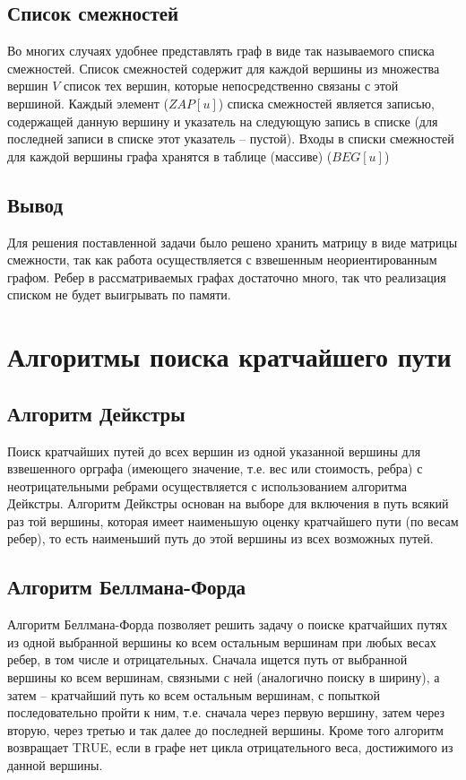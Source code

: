 \subsection{Список смежностей}

Во многих случаях удобнее представлять граф в виде так называемого списка
смежностей. Список смежностей содержит для каждой вершины из множества
вершин $V$ список тех вершин, которые непосредственно связаны с этой вершиной.
Каждый элемент ($ZAP[u]$) списка смежностей является записью, содержащей данную
вершину и указатель на следующую запись в списке (для последней записи в списке
этот указатель – пустой). Входы в списки смежностей для каждой вершины графа
хранятся в таблице (массиве) ($BEG [u]$)

\subsection{Вывод}

Для решения поставленной задачи было решено хранить матрицу в виде матрицы смежности, так как работа осуществляется с взвешенным неориентированным графом. Ребер в рассматриваемых графах достаточно много, так что реализация списком не будет выигрывать по памяти.

\section{Алгоритмы поиска кратчайшего пути}

\subsection{Алгоритм Дейкстры}

Поиск кратчайших путей до всех вершин из одной указанной вершины для
взвешенного орграфа (имеющего значение, т.е. вес или стоимость, ребра) с
неотрицательными ребрами осуществляется с использованием алгоритма Дейкстры.
Алгоритм Дейкстры основан на выборе для включения в путь всякий раз той
вершины, которая имеет наименьшую оценку кратчайшего пути (по весам ребер), то
есть наименьший путь до этой вершины из всех возможных путей.

\subsection{Алгоритм Беллмана-Форда}

Алгоритм Беллмана-Форда позволяет решить задачу о поиске кратчайших
путях из одной выбранной вершины ко всем остальным вершинам при любых весах
ребер, в том числе и отрицательных. Сначала ищется путь от выбранной вершины ко
всем вершинам, связными с ней (аналогично поиску в ширину), а затем – кратчайший
путь ко всем остальным вершинам, с попыткой последовательно пройти к ним, т.е.
сначала через первую вершину, затем через вторую, через третью и так далее до
последней вершины. Кроме того алгоритм возвращает TRUE, если в графе нет цикла
отрицательного веса, достижимого из данной вершины.

